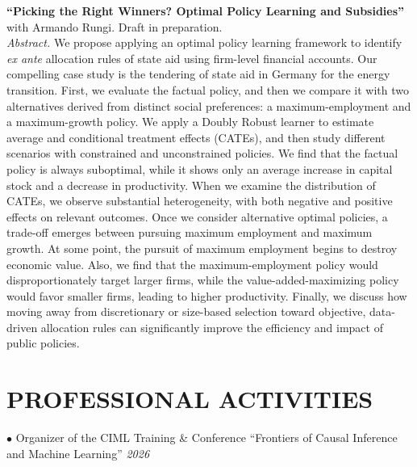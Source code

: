 \documentclass[11pt,a4paper]{article}
\newcommand{\activity}[2]{
  \noindent$\bullet$ #1 \textit{#2} \\[0.15cm]
}
\begin{document}
\noindent\textbf{``Picking the Right Winners? Optimal Policy Learning and Subsidies''} \\
with Armando Rungi. Draft in preparation. \\
\noindent\textit{Abstract.} We propose applying an optimal policy learning framework to identify \textit{ex ante} allocation rules of state aid using firm-level financial accounts. Our compelling case study is the tendering of state aid in Germany for the energy transition. First, we evaluate the factual policy, and then we compare it with two alternatives derived from distinct social preferences: a maximum-employment and a maximum-growth policy. We apply a Doubly Robust learner to estimate average and conditional treatment effects (CATEs), and then study different scenarios with constrained and unconstrained policies. We find that the factual policy is always suboptimal, while it shows only an average increase in capital stock and a decrease in productivity. When we examine the distribution of CATEs, we observe substantial heterogeneity, with both negative and positive effects on relevant outcomes. Once we consider alternative optimal policies, a trade-off emerges between pursuing maximum employment and maximum growth. At some point, the pursuit of maximum employment begins to destroy economic value. Also, we find that the maximum-employment policy would disproportionately target larger firms, while the value-added-maximizing policy would favor smaller firms, leading to higher productivity. Finally, we discuss how moving away from discretionary or size-based selection toward objective, data-driven allocation rules can significantly improve the efficiency and impact of public policies.




\section*{PROFESSIONAL ACTIVITIES}

\activity{Organizer of the CIML Training \& Conference ``Frontiers of Causal Inference and Machine Learning''}{2026}
\end{document}
